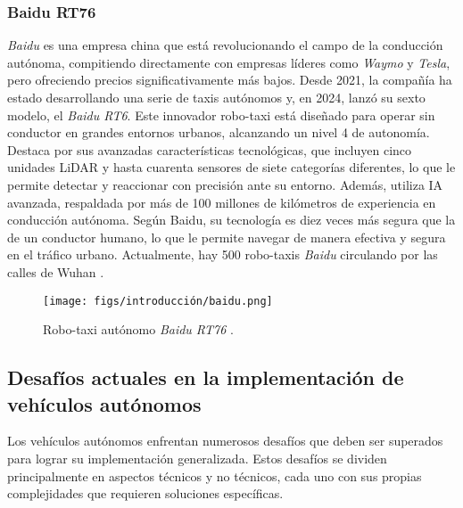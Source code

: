 \subsubsection{Baidu RT76}

\textit{Baidu} es una empresa china que está revolucionando el campo de la conducción autónoma, compitiendo directamente con empresas líderes como \textit{Waymo} y \textit{Tesla}, pero ofreciendo precios significativamente más bajos. Desde 2021, la compañía ha estado desarrollando una serie de taxis autónomos y, en 2024, lanzó su sexto modelo, el \textit{Baidu RT6}. Este innovador robo-taxi está diseñado para operar sin conductor en grandes entornos urbanos, alcanzando un nivel 4 de autonomía. Destaca por sus avanzadas características tecnológicas, que incluyen cinco unidades \ac{LiDAR} y hasta cuarenta sensores de siete categorías diferentes, lo que le permite detectar y reaccionar con precisión ante su entorno. Además, utiliza \ac{IA} avanzada, respaldada por más de 100 millones de kilómetros de experiencia en conducción autónoma. Según Baidu, su tecnología es diez veces más segura que la de un conductor humano, lo que le permite navegar de manera efectiva y segura en el tráfico urbano. Actualmente, hay 500 robo-taxis \textit{Baidu} circulando por las calles de Wuhan \cite{baidu}.

\begin{figure}[ht]
  \begin{center}
    \texttt{[image: figs/introducción/baidu.png]}
  \end{center}
  \caption{Robo-taxi autónomo \textit{Baidu RT76} \cite{foto-baidu}.}
  \label{baidu}
\end{figure}

\newpage

\subsection{Desafíos actuales en la implementación de vehículos autónomos}
\label{sec:desafíos}

Los vehículos autónomos enfrentan numerosos desafíos que deben ser superados para lograr su implementación generalizada. Estos desafíos se dividen principalmente en aspectos técnicos y no técnicos, cada uno con sus propias complejidades que requieren soluciones específicas.

